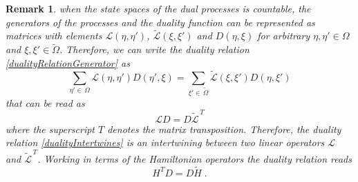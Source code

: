\documentclass[10pt]{article}
\numberwithin{equation}{section}
\numberwithin{equation}{subsection}
\newtheorem{remark}{Remark}
\newcommand{\dt}{\;.}
\begin{document}
\begin{remark}
when the state spaces of the dual processes is countable, the generators of the processes and the duality function can be represented as matrices with elements $\mathcal{L}(\eta,\eta')$, $\widetilde{\mathcal{L}}(\xi,\xi')$ and $D(\eta,\xi)$ for arbitrary $\eta,\eta'\in\Omega$ and $\xi,\xi'\in \widetilde{\Omega}$. Therefore, we can write the duality relation \eqref{dualityRelationGenerator} as 
\begin{equation}
    \sum_{\eta'\in\,\Omega}\mathcal{L}(\eta,\eta')D(\eta',\xi)=\sum_{\xi'\in\, \widetilde{\Omega}}\widetilde{\mathcal{L}}(\xi,\xi')D(\eta,\xi')
\end{equation}
that can be read as
\begin{equation}\label{dualityIntertwines}
    \mathcal{L}D=D\widetilde{\mathcal{L}}^{\,T}
\end{equation}
where the superscript $T$ denotes the matrix transposition. Therefore, the duality relation \eqref{dualityIntertwines} is an intertwining between two linear operators $\mathcal{L}$ and $\widetilde{\mathcal{L}}^{\,T}$. Working in terms of the Hamiltonian operators the duality relation reads 
\begin{equation}\label{DualityRelation}
    H^{T}D=D\widetilde{H}\dt
\end{equation}
\end{remark}
\end{document}
